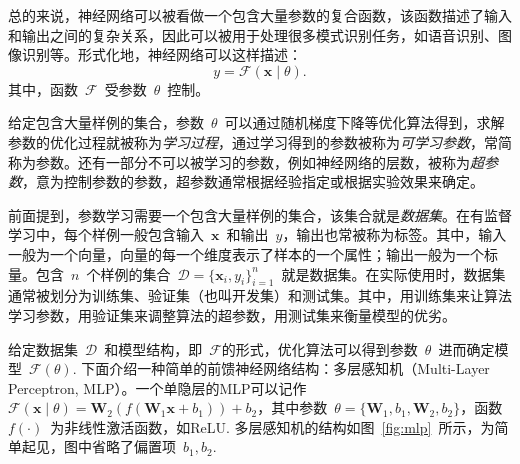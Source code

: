 总的来说，神经网络可以被看做一个包含大量参数的复合函数，该函数描述了输入和输出之间的复杂关系，因此可以被用于处理很多模式识别任务，如语音识别、图像识别等。形式化地，神经网络可以这样描述：
\begin{equation}
	y = \mathcal{F}(\mathbf{x} \mid \theta).
\end{equation}
其中，函数~$\mathcal{F}$~受参数~$\theta$~控制。

给定包含大量样例的集合，参数~$\theta$~可以通过随机梯度下降等优化算法得到，求解参数的优化过程就被称为\emph{学习过程}，通过学习得到的参数被称为\emph{可学习参数}，常简称为参数。还有一部分不可以被学习的参数，例如神经网络的层数，被称为\emph{超参数}，意为控制参数的参数，超参数通常根据经验指定或根据实验效果来确定。

前面提到，参数学习需要一个包含大量样例的集合，该集合就是\emph{数据集}。在有监督学习中，每个样例一般包含输入~$\mathbf{x}$~和输出~$y$，输出也常被称为标签。其中，输入一般为一个向量，向量的每一个维度表示了样本的一个属性；输出一般为一个标量。包含~$n$~个样例的集合~$\mathcal{D} = \{ \mathbf{x}_i, y_i \}_{i=1}^n$~就是数据集。在实际使用时，数据集通常被划分为训练集、验证集（也叫开发集）和测试集。其中，用训练集来让算法学习参数，用验证集来调整算法的超参数，用测试集来衡量模型的优劣。

给定数据集~$\mathcal{D}$~和模型结构，即~$\mathcal{F}$的形式，优化算法可以得到参数~$\theta$~进而确定模型~$\mathcal{F}(\theta)$. 下面介绍一种简单的前馈神经网络结构：多层感知机（Multi-Layer Perceptron, MLP）。一个单隐层的MLP可以记作~$\mathcal{F}(\mathbf{x} \mid \theta) = \mathbf{W}_2(f(\mathbf{W}_1\mathbf{x} + b_1))+b_2$，其中参数~$\theta = \{ \mathbf{W}_1, b_1, \mathbf{W}_2, b_2 \}$，函数~$f(\cdot)$~为非线性激活函数，如ReLU. 多层感知机的结构如图~\ref{fig:mlp}~所示，为简单起见，图中省略了偏置项~$b_1, b_2$.

